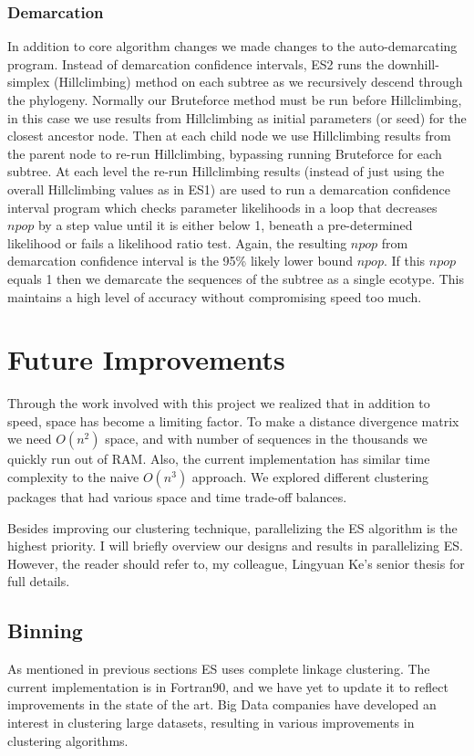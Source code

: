 \subsubsection*{Demarcation}
In addition to core algorithm changes we made changes to the auto-demarcating program.
Instead of demarcation confidence intervals, ES2 runs the downhill-simplex (Hillclimbing) method on each subtree as we recursively descend through the phylogeny.
Normally our Bruteforce method must be run before Hillclimbing, in this case we use results from Hillclimbing as initial parameters (or seed) for the closest ancestor node.
Then at each child node we use Hillclimbing results from the parent node to re-run Hillclimbing, bypassing running Bruteforce for each subtree.
At each level the re-run Hillclimbing results (instead of just using the overall Hillclimbing values as in ES1) are used to run a demarcation confidence interval program which checks parameter likelihoods in a loop that decreases $npop$ by a step value until it is either below 1, beneath a pre-determined likelihood or fails a likelihood ratio test.
Again, the resulting $npop$ from demarcation confidence interval is the 95\% likely lower bound $npop$.
If this $npop$ equals 1 then we demarcate the sequences of the subtree as a single ecotype.
This maintains a high level of accuracy without compromising speed too much.

\section{Future Improvements}
Through the work involved with this project we realized that in addition to speed, space has become a limiting factor.
To make a distance divergence matrix we need $O(n^2)$ space, and with number of sequences in the thousands we quickly run out of RAM. Also, the current implementation has similar time complexity to the naive $O(n^3)$ approach.
We explored different clustering packages that had various space and time trade-off balances.

Besides improving our clustering technique, parallelizing the ES algorithm is the highest priority.
I will briefly overview our designs and results in parallelizing ES.
However, the reader should refer to, my colleague, Lingyuan Ke's senior thesis for full details.
\subsection*{Binning}
As mentioned in previous sections ES uses complete linkage clustering.
The current implementation is in Fortran90, and we have yet to update it to reflect improvements in the state of the art.
Big Data companies have developed an interest in clustering large datasets, resulting in various improvements in clustering algorithms.
